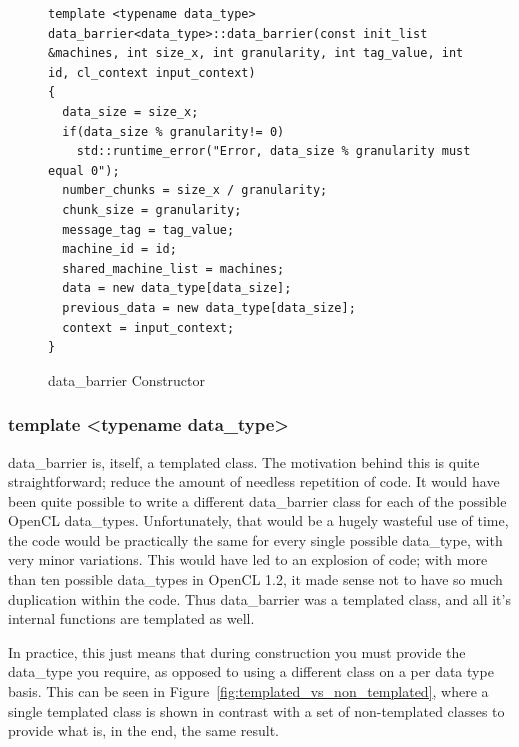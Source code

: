 \documentclass[../thesis.tex]{subfiles}
\begin{document}
  \begin{figure}[htbp]
    \centering

    \lstset{language=cpp}  
    \begin{lstlisting}[tabsize=2]
template <typename data_type> data_barrier<data_type>::data_barrier(const init_list &machines, int size_x, int granularity, int tag_value, int id, cl_context input_context)
{
  data_size = size_x;
  if(data_size % granularity!= 0)
    std::runtime_error("Error, data_size % granularity must equal 0");
  number_chunks = size_x / granularity;
  chunk_size = granularity;
  message_tag = tag_value;
  machine_id = id;
  shared_machine_list = machines;
  data = new data_type[data_size];
  previous_data = new data_type[data_size];
  context = input_context;
}
      \end{lstlisting}

    \caption{data\_barrier Constructor}
    \label{fig:data_barrier_constructor}
  \end{figure}
   

  \subsubsection{template <typename data\_type>} %
  \label{ssub:template_typename_data_type}
    data\_barrier is, itself, a templated class. The motivation behind this is quite straightforward; reduce the amount of needless repetition of code. It would have been quite possible to write a different data\_barrier class for each of the possible OpenCL data\_types. Unfortunately, that would be a hugely wasteful use of time, the code would be practically the same for every single possible data\_type, with very minor variations. This would have led to an explosion of code; with more than ten possible data\_types \cite{opencldatatypes} in OpenCL 1.2, it made sense not to have so much duplication within the code. Thus data\_barrier was a templated class, and all it's internal functions are templated as well.

    In practice, this just means that during construction you must provide the data\_type you require, as opposed to using a different class on a per data type basis. This can be seen in Figure~\ref{fig:templated_vs_non_templated}, where a single templated class is shown in contrast with a set of non-templated classes to provide what is, in the end, the same result.
\end{document}
